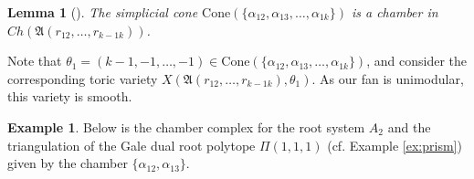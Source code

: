 \documentclass[11pt]{article}
\newtheorem{lemma}[theo]{Lemma}
\theoremstyle{definition}
\newtheorem{exam}[theo]{Example}
\numberwithin{equation}{section}
\newcommand{\cone}{\mathrm{Cone}}
\newcommand{\A}{\mathfrak{A}}
\begin{document}
\begin{lemma}[{\cite[Lemma 4.12]{HW}}]\label{cham_1}
The simplicial cone $\cone(\{\alpha_{12},\alpha_{13}, \ldots ,\alpha_{1k}\})$ is a 
chamber in $Ch(\A(r_{12}, \ldots ,r_{k-1 k}))$.
\end{lemma}

Note that $\theta_1 = (k-1,-1, \ldots ,-1)\in 
\cone(\{\alpha_{12},\alpha_{13}, \ldots ,\alpha_{1k}\})$,  and consider the 
corresponding toric variety
$X(\A(r_{12}, \ldots ,r_{k-1 k}), \theta_1)$. As our fan is unimodular, this variety is smooth.

\begin{exam}
Below is the chamber complex for the root system $A_2$ and the triangulation of 
the Gale dual root polytope $\Pi(1,1,1)$ (cf.  Example \ref{ex:prism}) given by 
the chamber $\{\alpha_{12}, \alpha_{13}\}$.
\end{exam}
\end{document}
